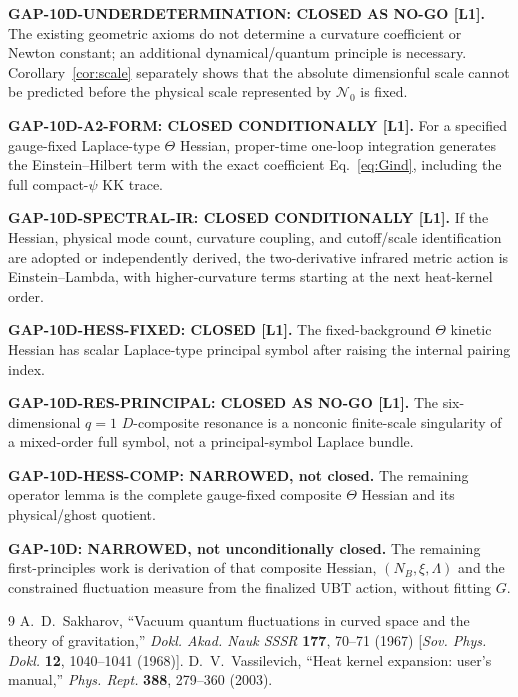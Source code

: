\documentclass[11pt,a4paper]{article}
\begin{document}
\begin{tcolorbox}[colback=green!6!white,colframe=green!55!black,title=Exact status]
\textbf{GAP-10D-UNDERDETERMINATION: CLOSED AS NO-GO [L1].}
The existing geometric axioms do not determine a curvature coefficient or
Newton constant; an additional dynamical/quantum principle is necessary.
Corollary~\ref{cor:scale} separately shows that the absolute dimensionful
scale cannot be predicted before the physical scale represented by
$\mathcal N_0$ is fixed.

\medskip
\textbf{GAP-10D-A2-FORM: CLOSED CONDITIONALLY [L1].}
For a specified gauge-fixed Laplace-type $\Theta$ Hessian, proper-time one-loop
integration generates the Einstein--Hilbert term with the exact coefficient
Eq.~\eqref{eq:Gind}, including the full compact-$\psi$ KK trace.

\medskip
\textbf{GAP-10D-SPECTRAL-IR: CLOSED CONDITIONALLY [L1].}
If the Hessian, physical mode count, curvature coupling, and cutoff/scale
identification are adopted or independently derived, the two-derivative
infrared metric action is Einstein--Lambda, with higher-curvature terms
starting at the next heat-kernel order.

\medskip
\textbf{GAP-10D-HESS-FIXED: CLOSED [L1].}
The fixed-background $\Theta$ kinetic Hessian has scalar Laplace-type
principal symbol after raising the internal pairing index.

\medskip
\textbf{GAP-10D-RES-PRINCIPAL: CLOSED AS NO-GO [L1].}
The six-dimensional $q=1$ $D$-composite resonance is a nonconic finite-scale
singularity of a mixed-order full symbol, not a principal-symbol Laplace
bundle.

\medskip
\textbf{GAP-10D-HESS-COMP: NARROWED, not closed.}
The remaining operator lemma is the complete gauge-fixed composite
$\Theta$ Hessian and its physical/ghost quotient.

\medskip
\textbf{GAP-10D: NARROWED, not unconditionally closed.}
The remaining first-principles work is derivation of that composite Hessian,
$(N_B,\xi,\Lambda)$ and the constrained fluctuation measure from the
finalized UBT action, without fitting $G$.
\end{tcolorbox}

\begin{thebibliography}{9}
A.~D.~Sakharov, ``Vacuum quantum fluctuations in curved space and the theory
of gravitation,'' \emph{Dokl. Akad. Nauk SSSR} \textbf{177}, 70--71 (1967)
[\emph{Sov. Phys. Dokl.} \textbf{12}, 1040--1041 (1968)].
D.~V.~Vassilevich, ``Heat kernel expansion: user's manual,''
\emph{Phys. Rept.} \textbf{388}, 279--360 (2003).
\end{thebibliography}
\end{document}
